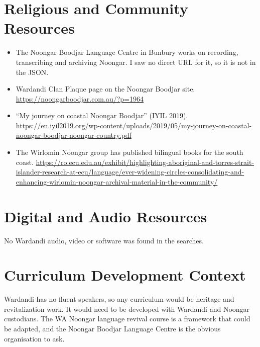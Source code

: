 \documentclass[12pt]{article}
\begin{document}
\section{Religious and Community Resources}
\begin{itemize}
\item The Noongar Boodjar Language Centre in Bunbury works on recording, transcribing and archiving Noongar. I saw no direct URL for it, so it is not in the JSON.
\item Wardandi Clan Plaque page on the Noongar Boodjar site. \url{https://noongarboodjar.com.au/?p=1964}
\item ``My journey on coastal Noongar Boodjar'' (IYIL 2019). \url{https://en.iyil2019.org/wp-content/uploads/2019/05/my-journey-on-coastal-noongar-boodjar-noongar-country.pdf}
\item The Wirlomin Noongar group has published bilingual books for the south coast. \url{https://ro.ecu.edu.au/exhibit/highlighting-aboriginal-and-torres-strait-islander-research-at-ecu/language/ever-widening-circles-consolidating-and-enhancing-wirlomin-noongar-archival-material-in-the-community/}
\end{itemize}

\section{Digital and Audio Resources}
No Wardandi audio, video or software was found in the searches.

\section{Curriculum Development Context}
Wardandi has no fluent speakers, so any curriculum would be heritage and revitalization work. It would need to be developed with Wardandi and Noongar custodians. The WA Noongar language revival course is a framework that could be adapted, and the Noongar Boodjar Language Centre is the obvious organisation to ask.
\end{document}
